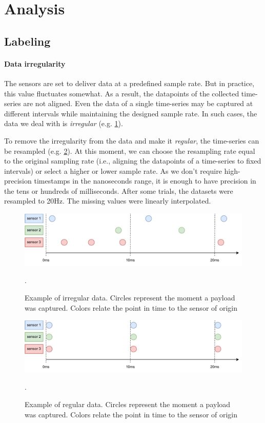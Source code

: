 \section{Analysis}
\label{ch:methodology}

\subsection{Labeling}

\paragraph{Data irregularity}

The sensors are set to deliver data at a predefined sample rate. But in practice, this value fluctuates somewhat. As a result, the datapoints of the collected time-series are not aligned. Even the data of a single time-series may be captured at different intervals while maintaining the designed sample rate. In such cases, the data we deal with is \emph{irregular} (e.g. \ref{image:irregular-data}).

To remove the irregularity from the data and make it \emph{regular}, the time-series can be resampled (e.g. \ref{image:regular-data}). At this moment, we can choose the resampling rate equal to the original sampling rate (i.e., aligning the datapoints of a time-series to fixed intervals) or select a higher or lower sample rate. As we don't require high-precision timestamps in the nanoseconds range, it is enough to have precision in the tens or hundreds of milliseconds. After some trials, the datasets were resampled to 20Hz. The missing values were linearly interpolated.

\begin{figure}[!h]
\centering
\includegraphics[width=\textwidth]{src/media/methodology/irregular-data2.pdf}
\caption{Example of irregular data. Circles represent the moment a payload was captured. Colors relate the point in time to the sensor of origin}.
\label{image:irregular-data}
\end{figure}

\begin{figure}[!h]
\centering
\includegraphics[width=\textwidth]{src/media/methodology/regular-data.pdf}
\caption{Example of regular data. Circles represent the moment a payload was captured. Colors relate the point in time to the sensor of origin}.
\label{image:regular-data}
\end{figure}

